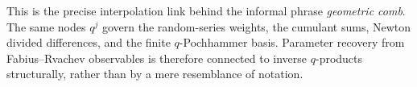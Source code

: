 This is the precise interpolation link behind the informal phrase
\emph{geometric comb}.  The same nodes \(q^j\) govern the random-series
weights, the cumulant sums, Newton divided differences, and the finite
\(q\)-Pochhammer basis.  Parameter recovery from Fabius--Rvachev observables is
therefore connected to inverse \(q\)-products structurally, rather than by a
mere resemblance of notation.
